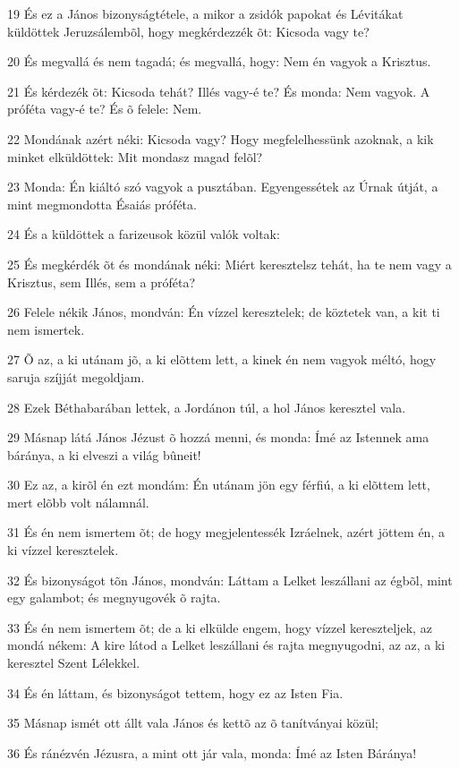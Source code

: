 \par 19 És ez a János bizonyságtétele, a mikor a zsidók papokat és Lévitákat küldöttek Jeruzsálembõl, hogy megkérdezzék õt: Kicsoda vagy te?
\par 20 És megvallá és nem tagadá; és megvallá, hogy: Nem én vagyok a Krisztus.
\par 21 És kérdezék õt: Kicsoda tehát? Illés vagy-é te? És monda: Nem vagyok. A próféta vagy-é te? És õ felele: Nem.
\par 22 Mondának azért néki: Kicsoda vagy? Hogy megfelelhessünk azoknak, a kik minket elküldöttek: Mit mondasz magad felõl?
\par 23 Monda: Én kiáltó szó vagyok a pusztában. Egyengessétek az Úrnak útját, a mint megmondotta Ésaiás próféta.
\par 24 És a küldöttek a farizeusok közül valók voltak:
\par 25 És megkérdék õt és mondának néki: Miért keresztelsz tehát, ha te nem vagy a Krisztus, sem Illés, sem a próféta?
\par 26 Felele nékik János, mondván: Én vízzel keresztelek; de köztetek van, a kit ti nem ismertek.
\par 27 Õ az, a ki utánam jõ, a ki elõttem lett, a kinek én nem  vagyok méltó, hogy saruja szíjját megoldjam.
\par 28 Ezek Béthabarában lettek, a Jordánon túl, a hol János keresztel vala.
\par 29 Másnap látá János Jézust õ hozzá menni, és monda: Ímé az Istennek ama báránya, a ki  elveszi a világ bûneit!
\par 30 Ez az, a kirõl én ezt mondám: Én utánam jön egy férfiú, a ki elõttem lett, mert elõbb volt nálamnál.
\par 31 És én nem ismertem õt; de hogy megjelentessék Izráelnek, azért jöttem én, a ki vízzel keresztelek.
\par 32 És bizonyságot tõn János, mondván: Láttam a Lelket leszállani az égbõl, mint egy galambot; és megnyugovék õ rajta.
\par 33 És én nem ismertem õt; de a ki elkülde engem, hogy vízzel kereszteljek, az mondá nékem: A kire látod a Lelket leszállani és rajta megnyugodni, az az, a ki keresztel Szent Lélekkel.
\par 34 És én láttam, és bizonyságot tettem, hogy ez az Isten Fia.
\par 35 Másnap ismét ott állt vala János és kettõ az õ tanítványai közül;
\par 36 És ránézvén Jézusra, a mint ott jár vala, monda: Ímé az Isten Báránya!
